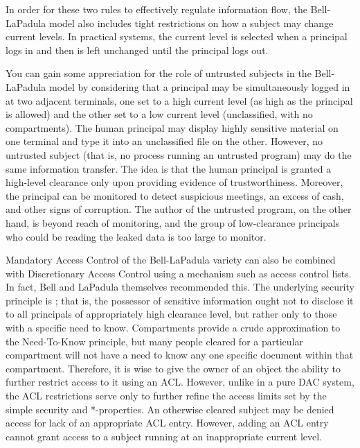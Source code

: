 In order for these two rules to effectively regulate information flow,
the Bell-LaPadula model also includes tight restrictions on how a
subject may change current levels.  In practical systems, the current
level is selected when a principal logs in and then is left unchanged
until the principal logs out.

You can gain some appreciation for the role of untrusted subjects in the
Bell-LaPadula model by considering that a principal may be
simultaneously logged in at two adjacent terminals, one set to a high
current level (as high as the principal is allowed) and the other set
to a low current level (unclassified, with no compartments).  The
human principal may display highly sensitive material on one terminal
and type it into an unclassified file on the other.  However, no
untrusted subject (that is, no process running an untrusted program)
may do the same information transfer.  The idea is that the human
principal is granted a high-level clearance only upon providing evidence
of trustworthiness.  Moreover, the principal can be monitored to
detect suspicious meetings, an excess of cash, and other signs of
corruption.  The author of the untrusted program, on the other hand,
is beyond reach of monitoring, and the group of low-clearance
principals who could be reading the leaked data is too large to
monitor.

Mandatory Access Control of the Bell-LaPadula variety can also be
combined with Discretionary Access Control using a mechanism such as
access control lists.  In fact, Bell and LaPadula themselves
recommended this.  The underlying security principle is ; that is, the possessor of sensitive information ought not to
disclose it to all principals of appropriately high clearance level,
but rather only to those with a specific need to know.  Compartments
provide a crude approximation to the Need-To-Know principle, but many
people cleared for a particular compartment will not have a
need to know any one specific document within that compartment.
Therefore, it is wise to give the owner of an object the ability to
further restrict access to it using an ACL.  However, unlike in a pure
DAC system, the ACL restrictions serve only to further refine the
access limits set by the simple security and *-properties.  An
otherwise cleared subject may be denied access for lack of an
appropriate ACL entry.  However, adding an ACL entry cannot grant
access to a subject running at an inappropriate current level.

